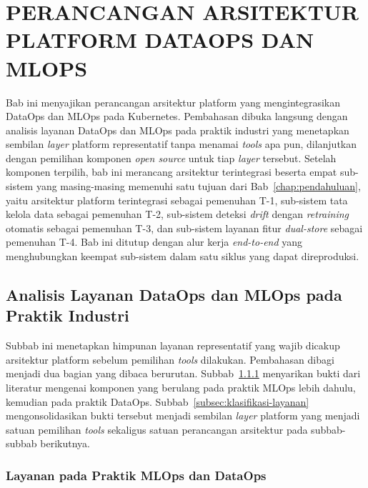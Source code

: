 \cleardoublepage
\chapter{PERANCANGAN ARSITEKTUR PLATFORM DATAOPS DAN MLOPS}
\label{chap:perancangan}

Bab ini menyajikan perancangan arsitektur platform yang mengintegrasikan DataOps dan MLOps pada Kubernetes. Pembahasan dibuka langsung dengan analisis layanan DataOps dan MLOps pada praktik industri yang menetapkan sembilan \textit{layer} platform representatif tanpa menamai \textit{tools} apa pun, dilanjutkan dengan pemilihan komponen \textit{open source} untuk tiap \textit{layer} tersebut. Setelah komponen terpilih, bab ini merancang arsitektur terintegrasi beserta empat sub-sistem yang masing-masing memenuhi satu tujuan dari Bab~\ref{chap:pendahuluan}, yaitu arsitektur platform terintegrasi sebagai pemenuhan T-1, sub-sistem tata kelola data sebagai pemenuhan T-2, sub-sistem deteksi \textit{drift} dengan \textit{retraining} otomatis sebagai pemenuhan T-3, dan sub-sistem layanan fitur \textit{dual-store} sebagai pemenuhan T-4. Bab ini ditutup dengan alur kerja \textit{end-to-end} yang menghubungkan keempat sub-sistem dalam satu siklus yang dapat direproduksi.

\section{Analisis Layanan DataOps dan MLOps pada Praktik Industri}
\label{sec:layanan-industri}

Subbab ini menetapkan himpunan layanan representatif yang wajib dicakup arsitektur platform sebelum pemilihan \textit{tools} dilakukan. Pembahasan dibagi menjadi dua bagian yang dibaca berurutan. Subbab~\ref{subsec:layanan-praktik} menyarikan bukti dari literatur mengenai komponen yang berulang pada praktik MLOps lebih dahulu, kemudian pada praktik DataOps. Subbab~\ref{subsec:klasifikasi-layanan} mengonsolidasikan bukti tersebut menjadi sembilan \textit{layer} platform yang menjadi satuan pemilihan \textit{tools} sekaligus satuan perancangan arsitektur pada subbab-subbab berikutnya.

\subsection{Layanan pada Praktik MLOps dan DataOps}
\label{subsec:layanan-praktik}

